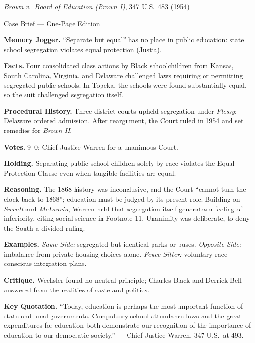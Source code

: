 \documentclass[12pt]{article}
\begin{document}
\begin{center}
{\Large \textit{Brown v.\ Board of Education (Brown I)}, 347 U.S.\ 483 (1954)\par}
\vspace{0.3em}
{\normalsize Case Brief --- One-Page Edition\par}
\end{center}

\textbf{Memory Jogger.} ``Separate but equal'' has no place in public education: state school segregation violates equal protection (\href{https://supreme.justia.com/cases/federal/us/347/483/}{Justia}).

\textbf{Facts.} Four consolidated class actions by Black schoolchildren from Kansas, South Carolina, Virginia, and Delaware challenged laws requiring or permitting segregated public schools. In Topeka, the schools were found substantially equal, so the suit challenged segregation itself.

\textbf{Procedural History.} Three district courts upheld segregation under \textit{Plessy}; Delaware ordered admission. After reargument, the Court ruled in 1954 and set remedies for \textit{Brown II}.

\textbf{Votes.} 9--0: Chief Justice Warren for a unanimous Court.

\textbf{Holding.} Separating public school children solely by race violates the Equal Protection Clause even when tangible facilities are equal.

\textbf{Reasoning.} The 1868 history was inconclusive, and the Court ``cannot turn the clock back to 1868''; education must be judged by its present role. Building on \textit{Sweatt} and \textit{McLaurin}, Warren held that segregation itself generates a feeling of inferiority, citing social science in Footnote 11. Unanimity was deliberate, to deny the South a divided ruling.

\textbf{Examples.} \emph{Same-Side:} segregated but identical parks or buses. \emph{Opposite-Side:} imbalance from private housing choices alone. \emph{Fence-Sitter:} voluntary race-conscious integration plans.

\textbf{Critique.} Wechsler found no neutral principle; Charles Black and Derrick Bell answered from the realities of caste and politics.

\textbf{Key Quotation.} ``Today, education is perhaps the most important function of state and local governments. Compulsory school attendance laws and the great expenditures for education both demonstrate our recognition of the importance of education to our democratic society.'' --- Chief Justice Warren, 347 U.S.\ at 493.
\end{document}
